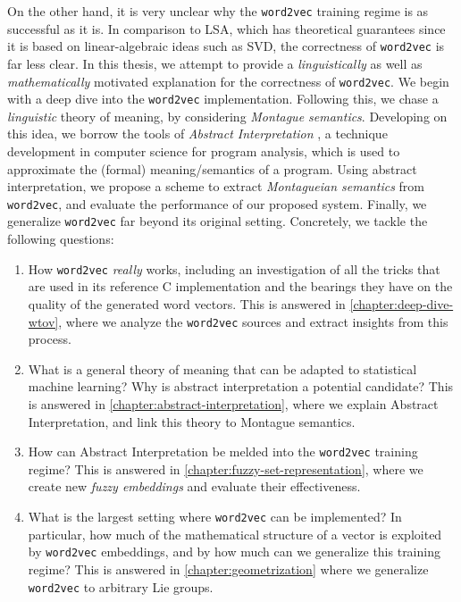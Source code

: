 \documentclass[11pt]{book}
\begin{document}
On the other hand, it is very unclear why the \texttt{word2vec} training regime
is as successful as it is. 
In comparison to LSA, which has theoretical guarantees
since it is based on linear-algebraic ideas such as SVD, the correctness of
\texttt{word2vec} is far less clear. In this thesis, we 
attempt to provide a
\emph{linguistically} as well as \emph{mathematically} motivated explanation
for the correctness of \texttt{word2vec}. We begin with a deep dive into the \texttt{word2vec}
implementation. Following this, we chase a \emph{linguistic} theory of meaning,
by considering \emph{Montague semantics}. Developing on this idea, we borrow the tools of
\emph{Abstract Interpretation} \cite{cousout1996abstract}, a technique development in computer science for
program analysis, which is used to approximate the (formal) meaning/semantics
of a program. Using abstract interpretation, we propose a scheme to extract
\emph{Montagueian semantics} from \texttt{word2vec}, and evaluate the
performance of our proposed system. Finally, we generalize \texttt{word2vec}
far beyond its original setting. Concretely, we tackle the following questions:

\begin{enumerate}
    \item How \texttt{word2vec} \emph{really} works, including an
        investigation of all the tricks that are used in its reference C
        implementation and the bearings they have on the quality of the
        generated word vectors. This is answered in \autoref{chapter:deep-dive-wtov},
        where we analyze the \texttt{word2vec} sources and extract insights from this process.
    \item What is a general theory of meaning that can be adapted to
        statistical machine learning? Why is abstract interpretation a
        potential candidate? This is answered in \autoref{chapter:abstract-interpretation},
        where we explain Abstract Interpretation, and link this theory to Montague semantics.
    \item How can Abstract Interpretation be melded into the \texttt{word2vec}
        training regime? This is answered in
        \autoref{chapter:fuzzy-set-representation}, where we create new
        \emph{fuzzy embeddings} and evaluate their effectiveness.
    \item What is the largest setting where \texttt{word2vec} can be
        implemented? In particular, how much of the mathematical structure of a
        vector is exploited by \texttt{word2vec} embeddings, and by how much
        can we generalize this training regime? This is answered in
        \autoref{chapter:geometrization} where we generalize \texttt{word2vec} to arbitrary Lie groups.
\end{enumerate}
\end{document}
